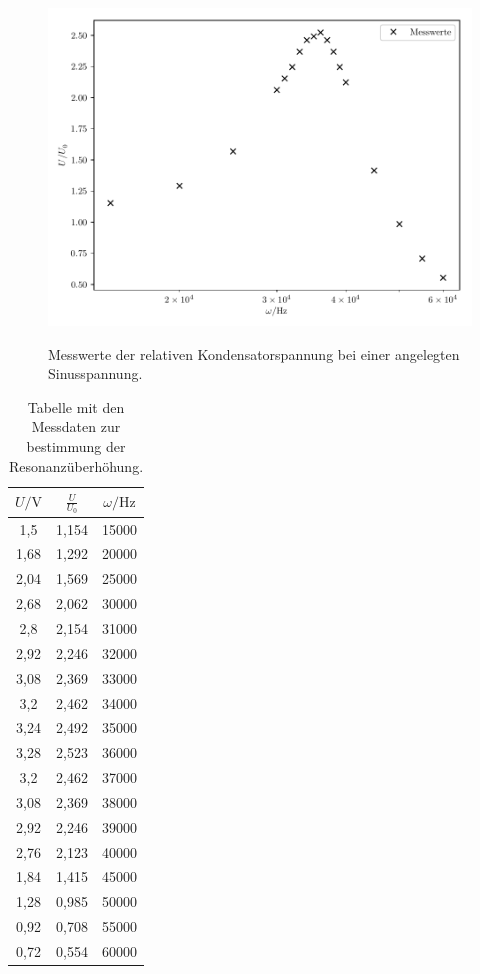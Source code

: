 \begin{figure}[H]
  \centering
  \caption{Messwerte der relativen Kondensatorspannung bei einer angelegten Sinusspannung.}
  \includegraphics[width=\textwidth]{plot2.pdf}
  \label{fig:8}
\end{figure}

\begin{table}[H]
  \centering
  \caption{Tabelle mit den Messdaten zur bestimmung der Resonanzüberhöhung.}
  \label{tab:2}
  \begin{tabular}{c c c}
    \toprule
    $U/\si{\V}$ & $\frac{U}{U_0}$ & $ \omega / \si{\Hz}$ \\
    \midrule
    1,5  & 1,154 &  15000 \\
    1,68 & 1,292 &  20000 \\
    2,04 & 1,569 &  25000 \\
    2,68 & 2,062 &  30000 \\
    2,8  & 2,154 &  31000 \\
    2,92 & 2,246 &  32000 \\
    3,08 & 2,369 &  33000 \\
    3,2  & 2,462 &  34000 \\
    3,24 & 2,492 &  35000 \\
    3,28 & 2,523 &  36000 \\
    3,2  & 2,462 &  37000 \\
    3,08 & 2,369 &  38000 \\
    2,92 & 2,246 &  39000 \\
    2,76 & 2,123 &  40000 \\
    1,84 & 1,415 &  45000 \\
    1,28 & 0,985 &  50000 \\
    0,92 & 0,708 &  55000 \\
    0,72 & 0,554 &  60000 \\
    \bottomrule
  \end{tabular}
\end{table}

